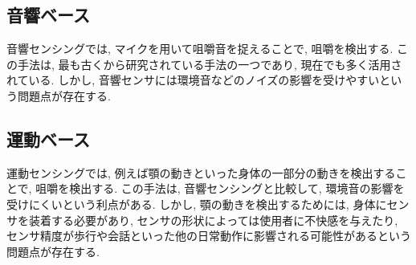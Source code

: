 \begin{table*}[t]
    \centering
    \caption{咀嚼検出に関する関連研究}
    \label{chewing_detection_related_work}
\end{table*}

\subsection{音響ベース}

音響センシングでは, マイクを用いて咀嚼音を捉えることで, 咀嚼を検出する. この手法は, 最も古くから研究されている手法の一つであり, 現在でも多く活用されている.\cite{5690449}\cite{8037060} しかし, 音響センサには環境音などのノイズの影響を受けやすいという問題点が存在する.

\subsection{運動ベース}

運動センシングでは, 例えば顎の動きといった身体の一部分の動きを検出することで, 咀嚼を検出する.\cite{6047558}\cite{9942809} この手法は, 音響センシングと比較して, 環境音の影響を受けにくいという利点がある. しかし, 顎の動きを検出するためには, 身体にセンサを装着する必要があり, センサの形状によっては使用者に不快感を与えたり, センサ精度が歩行や会話といった他の日常動作に影響される可能性があるという問題点が存在する.

